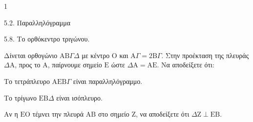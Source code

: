 \begin{ylh}{1}
    \item 5.2. Παραλληλόγραμμα
    \item 5.8. Το ορθόκεντρο τριγώνου.
\end{ylh}
Δίνεται ορθογώνιο $\mathrm{A}\mathrm{B}\Gamma\Delta$ με κέντρο $\mathrm{O}$ και $\mathrm{A}\Gamma = 2\mathrm{B}\Gamma$. Στην προέκταση της πλευράς $\Delta\mathrm{A}$, προς το $\mathrm{A}$, παίρνουμε σημείο $\mathrm{E}$ ώστε $\Delta\mathrm{A} = \mathrm{A}\mathrm{E}$.
Να αποδείξετε ότι:
\begin{alist}
    \item Το τετράπλευρο $\mathrm{A}\mathrm{E}\mathrm{B}\Gamma$ είναι παραλληλόγραμμο. 
    \item Το τρίγωνο $\mathrm{E}\mathrm{B}\Delta$ είναι ισόπλευρο. 
    \item Αν η $\mathrm{E}\mathrm{O}$ τέμνει την πλευρά $\mathrm{A}\mathrm{B}$ στο σημείο $\mathrm{Z}$, να αποδείξετε ότι $\Delta\mathrm{Z} \perp \mathrm{E}\mathrm{B}$. 
\end{alist}
